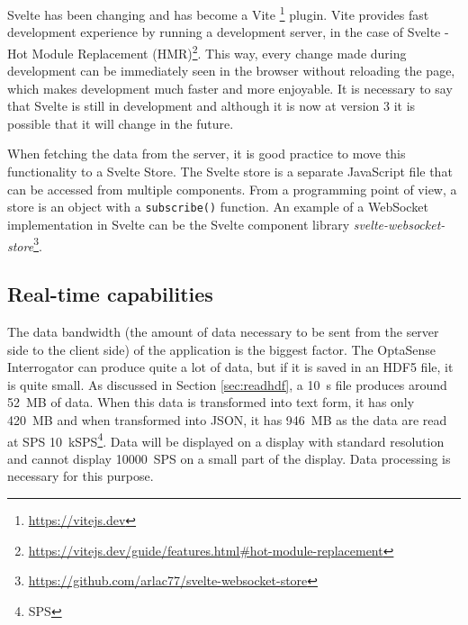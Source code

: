 Svelte has been changing and has become a Vite \footnote{\url{https://vitejs.dev}} plugin. Vite provides fast development experience by running a development server, in the case of Svelte - Hot Module Replacement (HMR)\footnote{\url{https://vitejs.dev/guide/features.html\#hot-module-replacement}}. This way, every change made during development can be immediately seen in the browser without reloading the page, which makes development much faster and more enjoyable. It is necessary to say that Svelte is still in development and although it is now at version 3 it is possible that it will change in the future. 

When fetching the data from the server, it is good practice to move this functionality to a Svelte Store. The Svelte store is a separate JavaScript file that can be accessed from multiple components. From a programming point of view, a store is an object with a \verb|subscribe()| function. An example of a WebSocket implementation in Svelte can be the Svelte component library \textit{svelte-websocket-store}\footnote{\url{https://github.com/arlac77/svelte-websocket-store}}.

\subsection{Real-time capabilities}

The data bandwidth (the amount of data necessary to be sent from the server side to the client side) of the application is the biggest factor. The OptaSense Interrogator can produce quite a lot of data, but if it is saved in an HDF5 file, it is quite small. As discussed in Section \ref{sec:readhdf}, a \qty{10}{\second} file produces around \qty{52}{MB} of data. When this data is transformed into text form, it has only \qty{420}{MB} and when transformed into JSON, it has \qty{946}{MB} as the data are read at \ac{SPS} \qty{10}{kSPS}\footnote{\ac{SPS}}. Data will be displayed on a display with standard resolution and cannot display \qty{10000}{SPS} on a small part of the display. Data processing is necessary for this purpose. 



